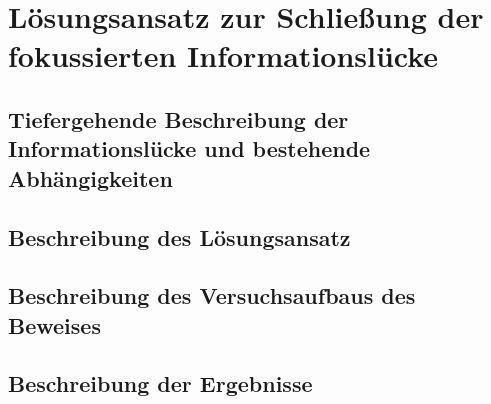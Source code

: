 \chapter{Lösungsansatz zur Schlie\ss ung der fokussierten Informationslücke}

\section{Tiefergehende Beschreibung der Informationslücke und bestehende Abhängigkeiten}
\section{Beschreibung des Lösungsansatz}
\section{Beschreibung des Versuchsaufbaus des Beweises}
\section{Beschreibung der Ergebnisse}

